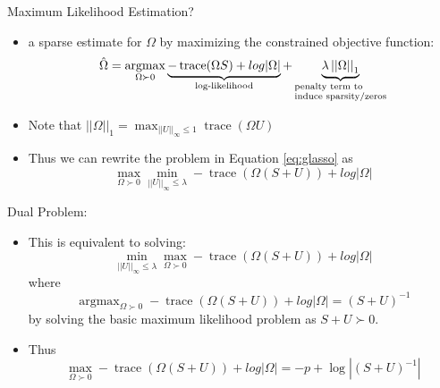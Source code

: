 \documentclass[xcolor=dvipsnames,aspectratio=1610]{beamer}
\newcommand{\norm}[1]{\left|\left|#1\right|\right|}
\DeclareMathOperator*{\trace}{trace}
\DeclareMathOperator*{\argmax}{argmax}
\theoremstyle{remark}
\begin{document}
\begin{frame}{Maximum Likelihood Estimation?}
  \begin{itemize}
    \setlength{\itemsep}{10pt}
  \item \Obtain a sparse estimate for $\Omega$ by maximizing
    the constrained objective function:
\begin{equation} \label{eq:glasso}
\hat{\Omega} = \argmax_{\Omega \succ 0} \underbrace{ - \trace (\Omega S) + log |\Omega|}_{\text{log-likelihood}} + \underbrace{\lambda \norm{\Omega}_1}_{\begin{subarray}{l}\text{penalty term to}\\
    \text{induce sparsity/zeros}\end{subarray}}
\end{equation}
\item Note that $\norm{\Omega}_1 = \max_{\norm{U}_{\infty} \leq 1} \trace (\Omega U) $
\item Thus we can rewrite the problem in Equation \ref{eq:glasso} as 
\begin{equation} \label{glasso2}
\max_{\Omega \succ 0} \min_{\norm{U}_{\infty} \leq 
\lambda} - \trace (\Omega(S + U)) + log |\Omega|
\end{equation}
  \end{itemize}
\end{frame}

\begin{frame}{Dual Problem:}
  \begin{itemize}
    \setlength{\itemsep}{10pt}
  \item This is equivalent to solving:
\begin{equation} \label{dualglasso}
\min_{\norm{U}_{\infty} \leq \lambda}  \max_{\Omega \succ 0}- \trace (\Omega(S + U)) + log |\Omega|
\end{equation}
where
\begin{equation*} \label{indualglasso}
\argmax_{\Omega \succ 0}- \trace (\Omega(S + U)) + log |\Omega| = (S+U)^{-1}
\end{equation*}
by solving the basic maximum likelihood problem as $S+U \succ 0$.
\item Thus 
\begin{equation*} 
\max_{\Omega \succ 0}- \trace (\Omega(S + U)) + log |\Omega| = - p + \log|(S+U)^{-1}|
\end{equation*}
  \end{itemize}
\end{frame}
\end{document}
